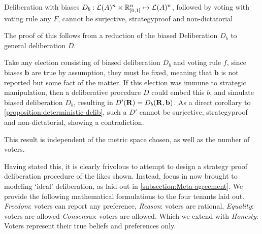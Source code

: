 \begin{corollary}
	Deliberation with biases ${D}_b: \mathcal{L}(A) ^ n \times \mathbb{R}_{[0,1]}^n \mapsto \mathcal{L}(A)^n$, followed by voting with voting rule any $F$, cannot be surjective, strategyproof and non-dictatorial

	\label{corollary:biased-delib}
\end{corollary}

The proof of this follows from a reduction of the biased Deliberation $D_b$ to general deliberation $D$.

\begin{proofc}{}
	Take any election consisting of biased deliberation $D_b$ and voting rule $f$, since biases $\mathbf{b}$ are true by assumption, they must be fixed, meaning that $\mathbf{b}$ is not reported but some fact of the matter. If this election was immune to strategic manipulation, then a deliberative procedure $D$ could embed this $b$, and simulate biased deliberation $D_b$, resulting in $D'(\mathbf{R}) = D_b(\mathbf{R}, \mathbf{b})$. As a direct corollary to \cref{proposition:deterministic-delib}, such a $D'$ cannot be surjective, strategyproof and non-dictatorial, showing a contradiction.
\end{proofc}

This result is independent of the metric space chosen, as well as the number of voters.

Having stated this, it is clearly frivolous to attempt to design a strategy proof deliberation procedure of the likes shown. Instead, focus in now brought to modeling `ideal' deliberation, as laid out in \cref{subsection:Meta-agreement}. We provide the following mathematical formulations to the four tenants laid out. \textit{Freedom}: voters can report any preference, \textit{Reason}: voters are rational, \textit{Equality}: voters are allowed \textit{Consensus}:  voters are allowed. Which we extend with \textit{Honesty}: Voters represent their true beliefs and preferences only.


